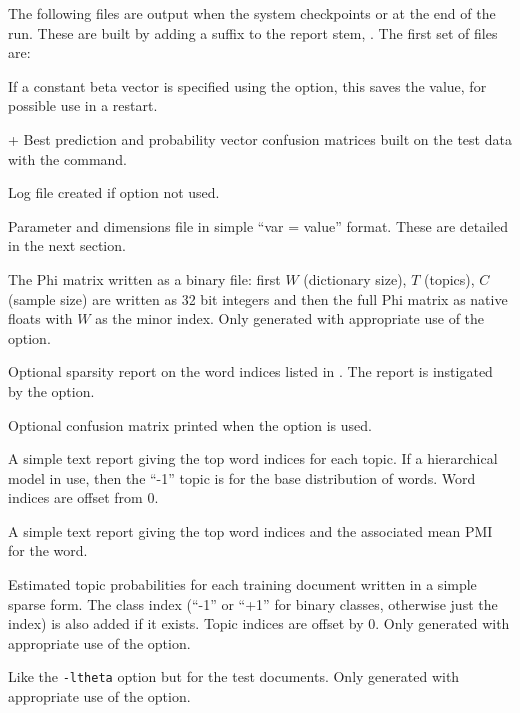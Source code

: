 \documentclass[a4paper,english]{article}
\begin{document}
The following files are output when the system checkpoints 
or at the end of the run.
These are built by adding a suffix to the report stem,
.
The first set of files are:
\begin{Description}\setlength{\itemsep}{0cm}
\item[\File{RepStem.beta}]  If a constant beta vector is specified
using the  option, this saves
   the value, for possible use in a restart.
\item[\File{RepStem.cnfs}+\File{RepStem.pcnfs}]  
Best prediction and probability vector confusion matrices
built on the test data with the 
 command.
\item[\File{RepStem.log}] Log file created if  option not used.
\item[\File{RepStem.par}] Parameter and dimensions file in simple ``var = value'' format.  These are detailed in the next section.
\item[\File{RepStem.phi}] The Phi matrix written as a binary file:
first $W$ (dictionary size), $T$ (topics), 
$C$ (sample size) are written as 32 bit integers and
then the full Phi matrix as native floats with $W$ as the minor index.
Only generated with appropriate use of the
 option.
\item[\File{RepStem.smap}] Optional sparsity report on the 
word indices listed in .
The report is instigated by the
 option.
\item[\File{RepStem.tbyc}]  Optional confusion matrix printed when
the  option is used.
\item[\File{RepStem.top}] A simple text report giving the top word indices
  for each topic.  If a hierarchical model in use, then the
``-1'' topic is for the base distribution of words.
Word indices are offset from 0.
\item[\File{RepStem.toppmi}] A simple text report giving the top word indices
and the associated mean PMI for the word.
\item[\File{RepStem.theta}] Estimated topic probabilities 
for each training document
written in a simple sparse form.  The class index
(``-1'' or ``+1'' for binary classes, otherwise just the index)
is also added if it exists.
Topic indices are offset by 0.
Only generated with appropriate use of the
 option.
\item[\File{RepStem.testprob}] 
Like the \texttt{-ltheta} option but for the test documents.
Only generated with appropriate use of the
 option.
\end{Description}
\end{document}
